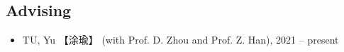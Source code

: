 \documentclass[10pt]{article}
\newenvironment{myitemize}
{ \begin{itemize}
    \setlength{\itemsep}{0pt}
    \setlength{\parskip}{0pt}
    \setlength{\parsep}{0pt}     }
{ \end{itemize}                  }
\begin{document}
\subsection*{Advising}
\begin{myitemize}
\itemsep0.5em 
\item TU, Yu 【涂瑜】 (with Prof. D. Zhou and Prof. Z. Han), 2021 -- present 
\end{myitemize}




\end{document}
